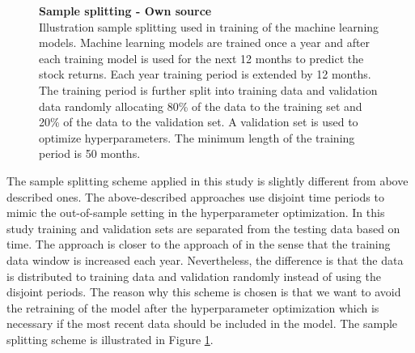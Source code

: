 \documentclass[12pt]{article}
\begin{document}
\begin{figure}[ht]
\centering
\caption[Sample splitting scheme]{\textbf{Sample splitting \textnormal{- Own source}}\\ Illustration sample splitting used in training of the machine learning models. Machine learning models are trained once a year and after each training model is used for the next 12 months to predict the stock returns. Each year training period is extended by 12 months. The training period is further split into training data and validation data randomly allocating 80\% of the data to the training set and 20\% of the data to the validation set. A validation set is used to optimize hyperparameters. The minimum length of the training period is 50 months.}
\label{plot:SampleSplitting}
\end{figure}

The sample splitting scheme applied in this study is slightly different from above described ones. The above-described approaches use disjoint time periods to mimic the out-of-sample setting in the hyperparameter optimization. In this study training and validation sets are separated from the testing data based on time. The approach is closer to the approach of \citet{guetal} in the sense that the training data window is increased each year. Nevertheless, the difference is that the data is distributed to training data and validation randomly instead of using the disjoint periods. The reason why this scheme is chosen is that we want to avoid the retraining of the model after the hyperparameter optimization which is necessary if the most recent data should be included in the model. The sample splitting scheme is illustrated in Figure \ref{plot:SampleSplitting}. \par
\end{document}
